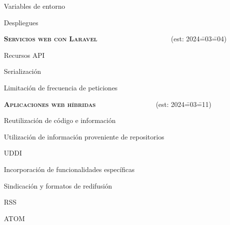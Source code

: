 \begin{longenum}
\begin{longenum}
\begin{longenum}
            \item Variables de entorno
            \item Despliegues
        \end{longenum}
    \end{longenum}
    \item \textbf{\textsc{Servicios web con Laravel}} \ \ \ \ \ \ \ \ \ \ \ \ \ \ \ \ \ \ \ \ \ (est: 2024\==03\==04)
    \begin{longenum}
        \item Recursos API
        \item Serialización
        \item Limitación de frecuencia de peticiones
    \end{longenum}
    \item \textbf{\textsc{Aplicaciones web híbridas}} \ \ \ \ \ \ \ \ \ \ \ \ \ \ \ \ \ (est: 2024\==03\==11)
    \begin{longenum}
        \item Reutilización de código e información
        \item Utilización de información proveniente de repositorios
        \begin{longenum}
            \item UDDI
        \end{longenum}
        \item Incorporación de funcionalidades específicas
        \item Sindicación y formatos de redifusión
        \begin{longenum}
            \item RSS
            \item ATOM
        \end{longenum}
    \end{longenum}
\end{longenum}
